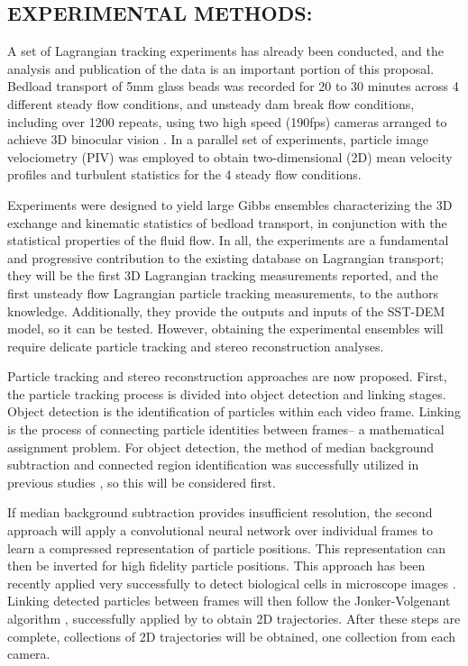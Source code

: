 \subsection{EXPERIMENTAL METHODS:} \label{sec:exptmethods}
A set of Lagrangian tracking experiments has already been conducted, and the analysis and publication of the data is an important portion of this proposal. Bedload transport of 5mm glass beads was recorded for 20 to 30 minutes across 4 different steady flow conditions, and unsteady dam break flow conditions, including over 1200 repeats, using two high speed (190fps) cameras arranged to achieve 3D binocular vision \citep{Wohler2009}. In a parallel set of experiments, particle image velociometry (PIV) \citep{Raffel1998} was employed to obtain two-dimensional (2D) mean velocity profiles and turbulent statistics for the 4 steady flow conditions. 
\bigskip 

Experiments were designed to yield large Gibbs ensembles characterizing the 3D exchange and kinematic statistics of bedload transport, in conjunction with the statistical properties of the fluid flow. In all, the experiments are a fundamental and progressive contribution to the existing database on Lagrangian transport; they will be the first 3D Lagrangian tracking measurements reported, and the first unsteady flow Lagrangian particle tracking measurements, to the authors knowledge. Additionally, they provide the outputs and inputs of the SST-DEM model, so it can be tested. However, obtaining the experimental ensembles will require delicate particle tracking and stereo reconstruction analyses.
\bigskip 

Particle tracking and stereo reconstruction approaches are now proposed. First, the particle tracking process is divided into object detection and linking stages. Object detection is the identification of particles within each video frame. Linking is the process of connecting particle identities between frames-- a mathematical assignment problem. For object detection, the method of median background subtraction and connected region identification was successfully utilized in previous studies \citep{Radice2006, Heyman2016}, so this will be considered first. 
\bigskip 

If median background subtraction provides insufficient resolution, the second approach will apply a convolutional neural network over individual frames to learn a compressed representation of particle positions. This representation can then be inverted for high fidelity particle positions. This approach has been recently applied very successfully to detect biological cells in microscope images \citep{Xue2017}. Linking detected particles between frames will then follow the Jonker-Volgenant algorithm \citep{Jonker1987}, successfully applied by \cite{Heyman2016} to obtain 2D trajectories. After these steps are complete, collections of 2D trajectories will be obtained, one collection from each camera. 
\bigskip 

